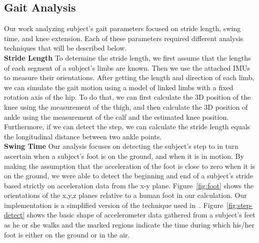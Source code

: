 \documentclass[conference]{IEEEtran}
\begin{document}
\subsection{Gait Analysis}
Our work analyzing subject's gait parameters focused on stride length, swing time, and
knee extension. Each of these parameters required different analysis techniques that will
be described below.\\ 
{\bf Stride Length} To determine the stride length, we first assume that the lengths of
each segment of a subject's limbs are known. Then we use the attached IMUs to measure
their orientations. After getting the length and direction of each limb, we can simulate
the gait motion using a model of linked limbs with a fixed rotation axis of the hip. To do
that, we can first calculate the 3D position of the knee using the measurement of the
thigh, and then calculate the 3D position of ankle using the measurement of the calf and
the estimated knee position. Furthermore, if we can detect the step, we can calculate the
stride length equals the longitudinal distance between two ankle points.\\
{\bf Swing Time} Our analysis focuses on detecting the subject's step to in turn ascertain
when a subject's foot is on the ground, and when it is in motion. By making the assumption
that the acceleration of the foot is close to zero when it is on the ground, we were able
to detect the beginning and end of a subject's stride based strictly on acceleration data
from the x-y plane. Figure~\ref{fig:foot} shows the orientations of the x,y,z planes
relative to a human foot in our calculation. Our implementation is a simplified version of
the technique used in~\cite{fancy}. Figure~\ref{fig:step-detect} shows the basic shape of
accelerometer data gathered from a subject's feet as he or she walks and the marked
regions indicate the time during which his/her foot is either on the ground or in the air.
\end{document}
